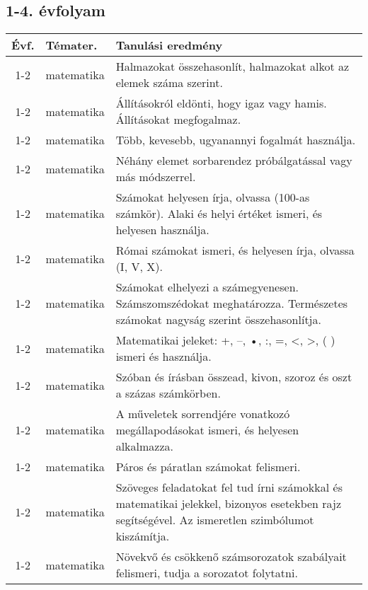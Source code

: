 \subsection{1-4. évfolyam}
\begin{small}
  \begin{longtable}{c | p{2cm} |  p{11cm} }
    \textbf{Évf.} & \textbf{Témater.} & \textbf{Tanulási eredmény} \\ \hline \hline
    \endhead

              1-2 & matematika & Halmazokat összehasonlít, halmazokat alkot az elemek száma szerint. \\ \hline
              1-2 & matematika & Állításokról eldönti, hogy igaz vagy hamis. Állításokat megfogalmaz. \\ \hline
              1-2 & matematika & Több, kevesebb, ugyanannyi fogalmát használja. \\ \hline
              1-2 & matematika & Néhány elemet sorbarendez próbálgatással vagy más módszerrel. \\ \hline
              1-2 & matematika & Számokat helyesen írja, olvassa (100-as számkör). Alaki és helyi értéket ismeri, és helyesen használja. \\ \hline
              1-2 & matematika & Római számokat ismeri, és helyesen írja, olvassa (I, V, X). \\ \hline
              1-2 & matematika & Számokat elhelyezi a számegyenesen. Számszomszédokat meghatározza. Természetes számokat nagyság szerint összehasonlítja. \\ \hline
              1-2 & matematika & Matematikai jeleket: +, –, •, :, =, <, >, ( ) ismeri és használja. \\ \hline
              1-2 & matematika & Szóban és írásban összead, kivon, szoroz és oszt a százas számkörben. \\ \hline
              1-2 & matematika & A műveletek sorrendjére vonatkozó megállapodásokat ismeri, és helyesen alkalmazza. \\ \hline
              1-2 & matematika & Páros és páratlan számokat felismeri. \\ \hline
              1-2 & matematika & Szöveges feladatokat fel tud írni számokkal és matematikai jelekkel, bizonyos esetekben rajz segítségével. Az ismeretlen szimbólumot kiszámítja. \\ \hline
              1-2 & matematika & Növekvő és csökkenő számsorozatok szabályait felismeri, tudja a sorozatot folytatni. \\ \hline

\end{longtable}
\end{small}
